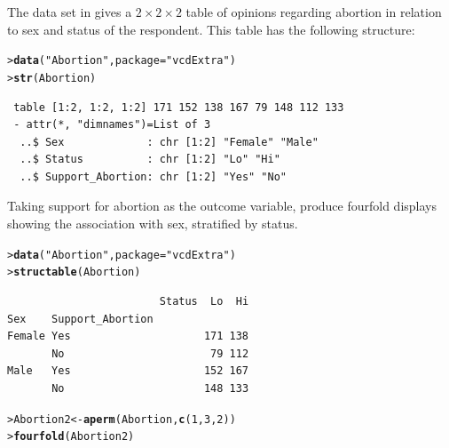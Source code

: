 \documentclass[10pt]{report}\usepackage[]{graphicx}\usepackage[]{color}
\makeatletter
\newcommand{\hlnum}[1]{\textcolor[rgb]{0.686,0.059,0.569}{#1}}%
\newcommand{\hlstr}[1]{\textcolor[rgb]{0.192,0.494,0.8}{#1}}%
\newcommand{\hlstd}[1]{\textcolor[rgb]{0.345,0.345,0.345}{#1}}%
\newcommand{\hlkwb}[1]{\textcolor[rgb]{0.69,0.353,0.396}{#1}}%
\newcommand{\hlkwc}[1]{\textcolor[rgb]{0.333,0.667,0.333}{#1}}%
\newcommand{\hlkwd}[1]{\textcolor[rgb]{0.737,0.353,0.396}{\textbf{#1}}}%
\newenvironment{kframe}{%
 \def\at@end@of@kframe{}%
 \ifinner\ifhmode%
  \def\at@end@of@kframe{\end{minipage}}%
  \begin{minipage}{\columnwidth}%
 \fi\fi%
 \def\FrameCommand##1{\hskip\@totalleftmargin \hskip-\fboxsep
 \colorbox{shadecolor}{##1}\hskip-\fboxsep
     \hskip-\linewidth \hskip-\@totalleftmargin \hskip\columnwidth}%
 \MakeFramed {\advance\hsize-\width
   \@totalleftmargin\z@ \linewidth\hsize
   \@setminipage}}%
 {\par\unskip\endMakeFramed%
 \at@end@of@kframe}
\newenvironment{knitrout}{}{} %
\renewenvironment{knitrout}{\small\renewcommand{\baselinestretch}{.85}}{} %
\makeatother
\begin{document}
\begin{Exercises}
  \exercise The data set  in  gives a $2 \times 2 \times 2$
  table of opinions regarding abortion in relation to sex and status of the
  respondent. This table has the following structure:
\begin{knitrout}\footnotesize
{}\color{fgcolor}\begin{kframe}
\begin{alltt}
\hlstd{> }\hlkwd{data}\hlstd{(}\hlstr{"Abortion"}\hlstd{,} \hlkwc{package} \hlstd{=} \hlstr{"vcdExtra"}\hlstd{)}
\hlstd{> }\hlkwd{str}\hlstd{(Abortion)}
\end{alltt}
\begin{verbatim}
 table [1:2, 1:2, 1:2] 171 152 138 167 79 148 112 133
 - attr(*, "dimnames")=List of 3
  ..$ Sex             : chr [1:2] "Female" "Male"
  ..$ Status          : chr [1:2] "Lo" "Hi"
  ..$ Support_Abortion: chr [1:2] "Yes" "No"
\end{verbatim}
\end{kframe}
\end{knitrout}
  \begin{enumerate*}
    \item Taking support for abortion as the outcome variable, produce fourfold displays   
    showing the association with sex, stratified by status.
    \begin{ans}
\begin{knitrout}\footnotesize
{}\color{fgcolor}\begin{kframe}
\begin{alltt}
\hlstd{> }\hlkwd{data}\hlstd{(}\hlstr{"Abortion"}\hlstd{,} \hlkwc{package}\hlstd{=}\hlstr{"vcdExtra"}\hlstd{)}
\hlstd{> }\hlkwd{structable}\hlstd{(Abortion)}
\end{alltt}
\begin{verbatim}
                        Status  Lo  Hi
Sex    Support_Abortion               
Female Yes                     171 138
       No                       79 112
Male   Yes                     152 167
       No                      148 133
\end{verbatim}
\begin{alltt}
\hlstd{> }\hlstd{Abortion2}\hlkwb{<-}\hlkwd{aperm}\hlstd{(Abortion,} \hlkwd{c}\hlstd{(}\hlnum{1}\hlstd{,}\hlnum{3}\hlstd{,}\hlnum{2}\hlstd{))}
\hlstd{> }\hlkwd{fourfold}\hlstd{(Abortion2)}
\end{alltt}
\end{kframe}


\end{knitrout}
\end{ans}
\end{enumerate*}
\end{Exercises}
\end{document}
